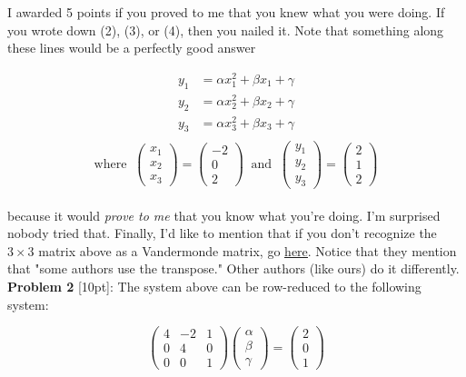 \documentclass{article}
\def\a{\alpha}
\def\b{\beta}
\def\c{\gamma}
\begin{document}
I awarded 5 points if you proved to me that you knew what you were doing. If you wrote down (2), (3), or (4), then you nailed it. Note that something along these lines would be a perfectly good answer

\begin{align*}
y_1 &=  \a x_1^2 + \b x_1 + \c \\
y_2 &=  \a x_2^2 + \b x_2 + \c \\
y_3 &=  \a x_3^2 + \b x_3 + \c  \\
\end{align*}
\[
\text{where} \;\; \begin{pmatrix} x_1 \\ x_2 \\ x_3 \end{pmatrix} = \begin{pmatrix} -2 \\ 0 \\ 2 \end{pmatrix} \;\; \text{and} \;\; \begin{pmatrix} y_1 \\ y_2 \\ y_3 \end{pmatrix} = \begin{pmatrix} 2 \\ 1 \\ 2 \end{pmatrix}
\] \\

because it would \textit{prove to me} that you know what you're doing. I'm surprised nobody tried that. Finally, I'd like to mention that if you don't  recognize the $3 \times 3$ matrix above as a Vandermonde matrix, go {\color{cyan} \underline{\href{http://en.wikipedia.org/wiki/Vandermonde_matrix}{here}}}. Notice that they mention that "some authors use the transpose." Other authors (like ours) do it differently.\\

\textbf{Problem 2} [10pt]: The system above can be row-reduced to the following system:

\[
\begin{pmatrix} 4 & -2 & 1 \\ 0 & 4 & 0 \\ 0 & 0 & 1 \end{pmatrix} \begin{pmatrix} \a \\ \b \\ \c \end{pmatrix} = \begin{pmatrix} 2 \\ 0 \\ 1 \end{pmatrix}
\]
\end{document}
